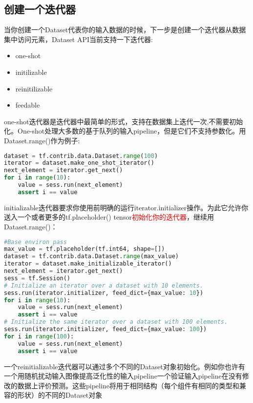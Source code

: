 \subsection{创建一个迭代器}
当你创建一个Dataset代表你的输入数据的时候，下一步是创建一个迭代器从数据集中访问元素，Dataset API当前支持一下迭代器:
\begin{itemize}
	\item one-shot
	\item initilizable
	\item reinitilizable
	\item feedable
\end{itemize}
one-shot迭代器是迭代器中最简单的形式，支持在数据集上迭代一次,不需要初始化。One-shot处理大多数的基于队列的输入pipeline，但是它们不支持参数化。用Dataset.range()作为例子:
\begin{lstlisting}[language=Python]
dataset = tf.contrib.data.Dataset.range(100)
iterator = dataset.make_one_shot_iterator()
next_element = iterator.get_next()
for i in range(10):
    value = sess.run(next_element)
    assert i == value
\end{lstlisting}
initializable迭代器要求你使用前明确的运行iterator.initializer操作。为此它允许你送入一个或者更多的tf.placeholder() tensor\textcolor{red}{初始化你的迭代器}，继续用Dataset.range()：
\begin{lstlisting}[language=Python]
#Base environ pass
max_value = tf.placeholder(tf.int64, shape=[])
dataset = tf.contrib.data.Dataset.range(max_value)
iterator = dataset.make_initializable_iterator()
next_element = iterator.get_next()
sess = tf.Session()
# Initialize an iterator over a dataset with 10 elements.
sess.run(iterator.initializer, feed_dict={max_value: 10})
for i in range(10):
    value = sess.run(next_element)
    assert i == value
# Initialize the same iterator over a dataset with 100 elements.
sess.run(iterator.initializer, feed_dict={max_value: 100})
for i in range(100):
    value = sess.run(next_element)
    assert i == value
\end{lstlisting}
一个reinitializable迭代器可以通过多个不同的Dataset对象初始化。例如你也许有一个用随机扰动输入图像提高泛化性的输入pipeline一个验证输入pipeline在没有修改的数据上评价预测。这些pipeline将用于相同结构（每个组件有相同的类型和兼容的形状）的不同的Dataset对象

